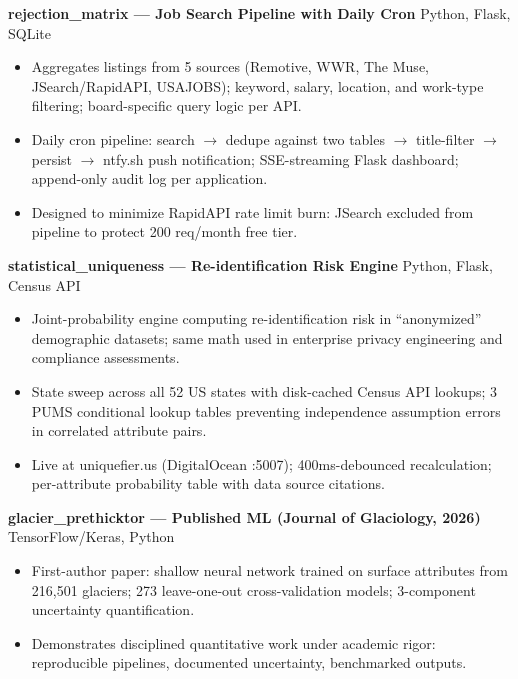 \documentclass[11pt,a4paper]{article}
\begin{document}
\vspace{0.2cm}
\noindent
\textbf{rejection\_matrix --- Job Search Pipeline with Daily Cron} \hfill Python, Flask, SQLite
\begin{itemize}
    \item Aggregates listings from 5 sources (Remotive, WWR, The Muse, JSearch/RapidAPI, USAJOBS); keyword, salary, location, and work-type filtering; board-specific query logic per API.
    \item Daily cron pipeline: search $\rightarrow$ dedupe against two tables $\rightarrow$ title-filter $\rightarrow$ persist $\rightarrow$ ntfy.sh push notification; SSE-streaming Flask dashboard; append-only audit log per application.
    \item Designed to minimize RapidAPI rate limit burn: JSearch excluded from pipeline to protect 200 req/month free tier.
\end{itemize}

\vspace{0.2cm}
\noindent
\textbf{statistical\_uniqueness --- Re-identification Risk Engine} \hfill Python, Flask, Census API
\begin{itemize}
    \item Joint-probability engine computing re-identification risk in ``anonymized'' demographic datasets; same math used in enterprise privacy engineering and compliance assessments.
    \item State sweep across all 52 US states with disk-cached Census API lookups; 3 PUMS conditional lookup tables preventing independence assumption errors in correlated attribute pairs.
    \item Live at uniquefier.us (DigitalOcean :5007); 400ms-debounced recalculation; per-attribute probability table with data source citations.
\end{itemize}

\vspace{0.2cm}
\noindent
\textbf{glacier\_prethicktor --- Published ML (Journal of Glaciology, 2026)} \hfill TensorFlow/Keras, Python
\begin{itemize}
    \item First-author paper: shallow neural network trained on surface attributes from 216,501 glaciers; 273 leave-one-out cross-validation models; 3-component uncertainty quantification.
    \item Demonstrates disciplined quantitative work under academic rigor: reproducible pipelines, documented uncertainty, benchmarked outputs.
\end{itemize}
\end{document}
